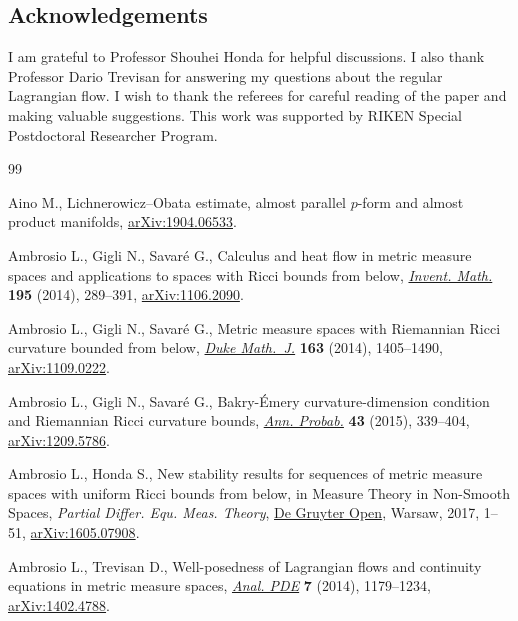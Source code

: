 \documentclass[pdftex]{sigma}
\numberwithin{equation}{section}
\theoremstyle{definition}
\begin{document}
\subsection*{Acknowledgements}
I am grateful to Professor Shouhei Honda for helpful discussions.
I also thank Professor Dario Trevisan for answering my questions about the regular Lagrangian flow.
I wish to thank the \mbox{referees} for careful reading of the paper and making valuable suggestions.
This work was supported by RIKEN Special Postdoctoral Researcher Program.

%
%
\begin{thebibliography}{99}
\footnotesize\itemsep=0pt

Aino M., Lichnerowicz--{O}bata estimate, almost parallel $p$-form and almost
 product manifolds, \href{https://arxiv.org/abs/1904.06533}{arXiv:1904.06533}.

Ambrosio L., Gigli N., Savar\'e G., Calculus and heat flow in metric measure
 spaces and applications to spaces with {R}icci bounds from below,
 \href{https://doi.org/10.1007/s00222-013-0456-1}{\textit{Invent. Math.}} \textbf{195} (2014), 289--391, \href{https://arxiv.org/abs/1106.2090}{arXiv:1106.2090}.

Ambrosio L., Gigli N., Savar\'e G., Metric measure spaces with {R}iemannian
 {R}icci curvature bounded from below, \href{https://doi.org/10.1215/00127094-2681605}{\textit{Duke Math.~J.}} \textbf{163}
 (2014), 1405--1490, \href{https://arxiv.org/abs/1109.0222}{arXiv:1109.0222}.

Ambrosio L., Gigli N., Savar\'e G., Bakry-\'Emery curvature-dimension condition
 and {R}iemannian {R}icci curvature bounds, \href{https://doi.org/10.1214/14-AOP907}{\textit{Ann. Probab.}} \textbf{43}
 (2015), 339--404, \href{https://arxiv.org/abs/1209.5786}{arXiv:1209.5786}.

Ambrosio L., Honda S., New stability results for sequences of metric measure
 spaces with uniform {R}icci bounds from below, in Measure Theory in
 Non-Smooth Spaces, \textit{Partial Differ. Equ. Meas. Theory}, \href{https://doi.org/10.1515/9783110550832-001}{De Gruyter Open},
 Warsaw, 2017, 1--51, \href{https://arxiv.org/abs/1605.07908}{arXiv:1605.07908}.

Ambrosio L., Trevisan D., Well-posedness of {L}agrangian flows and continuity
 equations in metric measure spaces, \href{https://doi.org/10.2140/apde.2014.7.1179}{\textit{Anal. PDE}} \textbf{7} (2014),
 1179--1234, \href{https://arxiv.org/abs/1402.4788}{arXiv:1402.4788}.


\end{thebibliography}
\end{document}
